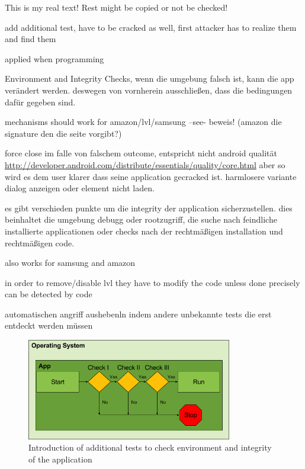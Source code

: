 This is my real text! Rest might be copied or not be checked!

add additional test, have to be cracked as well, first attacker has to realize them and find them

applied when programming

Environment and Integrity Checks, wenn die umgebung falsch ist, kann die app verändert werden. deswegen von vornherein ausschließen, dass die bedingungen dafür gegeben sind.
\cite{munteanLicense}

mechanisms should work for amazon/lvl/samsung --see- beweis! (amazon die signature den die seite vorgibt?)

force close im falle von falschem outcome, entspricht nicht android qualität
\url{http://developer.android.com/distribute/essentials/quality/core.html} aber so wird es dem user klarer dass seine application gecracked ist. harmlosere variante dialog anzeigen oder element nicht laden.

es gibt verschieden punkte um die integrity der application sicherzustellen. dies beinhaltet die umgebung debugg oder rootzugriff, die suche nach feindliche installierte applicationen oder checks nach der rechtmäßigen installation und rechtmäßigen code.

also works for samsung and amazon

%
in order to remove/disable lvl they have to modify the code
unless done precisely can be detected by code
\cite{developersSecuring}
%


automatischen angriff aushebenln indem andere unbekannte tests die erst entdeckt werden müssen

\begin{figure}[h]
    \centering
    \includegraphics[width=0.8\textwidth]{data/verificationNowAdditional.png}
    \caption{Introduction of additional tests to check environment and integrity of the application}
    \label{fig:verificationNowAdditional}
\end{figure}


